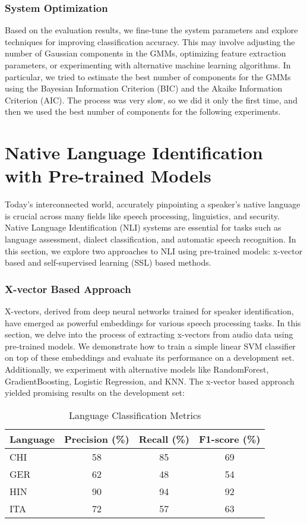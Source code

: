 \documentclass{Interspeech2024}
\begin{document}
\subsubsection{System Optimization}
Based on the evaluation results, we fine-tune the system parameters and explore techniques for improving classification accuracy. This may involve adjusting the number of Gaussian components in the GMMs, optimizing feature extraction parameters, or experimenting with alternative machine learning algorithms.
In particular, we tried to estimate the best number of components for the GMMs using the Bayesian Information Criterion (BIC) and the Akaike Information Criterion (AIC). The process was very slow, so we did it only the first time, and then we used the best number of components for the following experiments.


\section{Native Language Identification with Pre-trained Models}
Today's interconnected world, accurately pinpointing a speaker's native language is crucial across many fields like speech processing, linguistics, and security. Native Language Identification (NLI) systems are essential for tasks such as language assessment, dialect classification, and automatic speech recognition.
In this section, we explore two approaches to NLI using pre-trained models: x-vector based and self-supervised learning (SSL) based methods.

\subsubsection{X-vector Based Approach}

X-vectors, derived from deep neural networks trained for speaker identification, have emerged as powerful embeddings for various speech processing tasks. In this section, we delve into the process of extracting x-vectors from audio data using pre-trained models. We demonstrate how to train a simple linear SVM classifier on top of these embeddings and evaluate its performance on a development set. Additionally, we experiment with alternative models like RandomForest, GradientBoosting, Logistic Regression, and KNN. The x-vector based approach yielded promising results on the development set:
\begin{table}[htbp]
  \centering
  \caption{Language Classification Metrics}
    \begin{tabular}{lccc}
    \toprule
    Language & Precision (\%) & Recall (\%) & F1-score (\%) \\
    \midrule
    CHI   & 58 & 85 & 69 \\
    GER   & 62 & 48 & 54 \\
    HIN   & 90 & 94 & 92 \\
    ITA   & 72 & 57 & 63 \\
    \bottomrule
    \end{tabular}%
  \label{tab:metrics}%
\end{table}%
\end{document}
